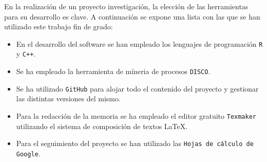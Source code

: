 En la realización de un proyecto investigación, la elección de las herramientas para su desarrollo es clave. A continuación se expone una lista con las que se han utilizado este trabajo fin de grado:

\begin{itemize}
	\item En el desarrollo del software se han empleado los lenguajes de
programación \texttt{R} y \texttt{C++}.
	\item Se ha empleado la herramienta de míneria de procesos \texttt{DISCO}.
	\item Se ha utilizado \texttt{GitHub} para alojar todo el 			contenido del proyecto y gestionar las distintas versiones del mismo.
	\item Para la redacción de la memoria se ha empleado el editor gratuito \texttt{Texmaker} utilizando el sistema de composición de textos \LaTeX.
	\item Para el seguimiento del proyecto se han utilizado las \texttt{Hojas de cálculo de Google}.
\end{itemize}